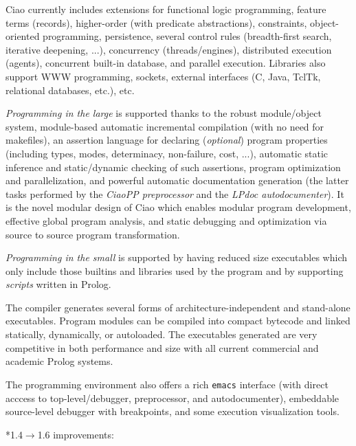 \documentclass{article}
\makeatletter
\def\subsection{\@startsection{subsection}{2}{\z@}{-1.0ex plus -1ex minus 
 -.2ex}{0.7ex plus .2ex}{\normalsize\bf}}
\makeatother
\begin{document}
Ciao currently includes extensions for functional logic programming,
feature terms (records), higher-order (with predicate abstractions),
constraints, object-oriented programming, persistence, several control
rules (breadth-first search, iterative deepening, ...), concurrency
(threads/engines), distributed execution (agents), concurrent built-in
database, and parallel execution.  Libraries also support WWW
programming, sockets, external interfaces (C, Java, TclTk, relational
databases, etc.), etc.

\emph{Programming in the large} is supported thanks to the robust
module/object system, module-based automatic incremental compilation
(with no need for makefiles), an assertion language for declaring
(\emph{optional}) program properties (including types, modes,
determinacy, non-failure, cost, ...), automatic static inference and
static/dynamic checking of such assertions, program optimization and
parallelization, and powerful automatic documentation generation (the
latter tasks performed by the \emph{CiaoPP preprocessor} and the
\emph{LPdoc autodocumenter}).  It is the novel modular design of Ciao
which enables modular program development, effective global program
analysis, and static debugging and optimization via source to source
program transformation.

\emph{Programming in the small} is supported by having reduced size
executables which only include those builtins and libraries used by
the program and by supporting \emph{scripts} written in Prolog.

The compiler generates several forms of architecture-independent and
stand-alone executables. Program modules can be compiled into compact
bytecode and linked statically, dynamically, or autoloaded. The
executables generated are very competitive in both performance and
size with all current commercial and academic Prolog systems.

The programming environment also offers a rich \texttt{emacs}
interface (with direct acccess to top-level/debugger, preprocessor,
and autodocumenter), embeddable source-level debugger with
breakpoints, and some execution visualization tools. 

\subsection*{1.4$\rightarrow$1.6 improvements:}
\end{document}
